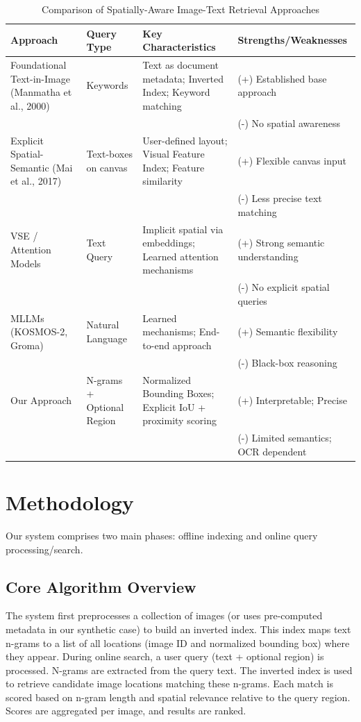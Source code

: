 \documentclass[manuscript,screen]{acmart}
\begin{document}
\begin{table}
  \caption{Comparison of Spatially-Aware Image-Text Retrieval Approaches}
  \label{tab:approaches}
  \begin{tabular}{p{2.8cm}p{2.8cm}p{4.5cm}p{3.4cm}}
    \toprule
    Approach & Query Type & Key Characteristics & Strengths/Weaknesses \\
    \midrule
    Foundational Text-in-Image (Manmatha et al., 2000) & Keywords & Text as document metadata; Inverted Index; Keyword matching & (+) Established base approach \\
    & & & (-) No spatial awareness \\
    \midrule
    Explicit Spatial-Semantic (Mai et al., 2017) & Text-boxes on canvas & User-defined layout; Visual Feature Index; Feature similarity & (+) Flexible canvas input \\
    & & & (-) Less precise text matching \\
    \midrule
    VSE / Attention Models & Text Query & Implicit spatial via embeddings; Learned attention mechanisms & (+) Strong semantic understanding \\
    & & & (-) No explicit spatial queries \\
    \midrule
    MLLMs (KOSMOS-2, Groma) & Natural Language & Learned mechanisms; End-to-end approach & (+) Semantic flexibility \\
    & & & (-) Black-box reasoning \\
    \midrule
    Our Approach & N-grams + Optional Region & Normalized Bounding Boxes; Explicit IoU + proximity scoring & (+) Interpretable; Precise \\
    & & & (-) Limited semantics; OCR dependent \\
  \bottomrule
\end{tabular}
\end{table}

\section{Methodology}

Our system comprises two main phases: offline indexing and online query processing/search.

\subsection{Core Algorithm Overview}

The system first preprocesses a collection of images (or uses pre-computed metadata in our synthetic case) to build an inverted index. This index maps text n-grams to a list of all locations (image ID and normalized bounding box) where they appear. During online search, a user query (text + optional region) is processed. N-grams are extracted from the query text. The inverted index is used to retrieve candidate image locations matching these n-grams. Each match is scored based on n-gram length and spatial relevance relative to the query region. Scores are aggregated per image, and results are ranked.
\end{document}
